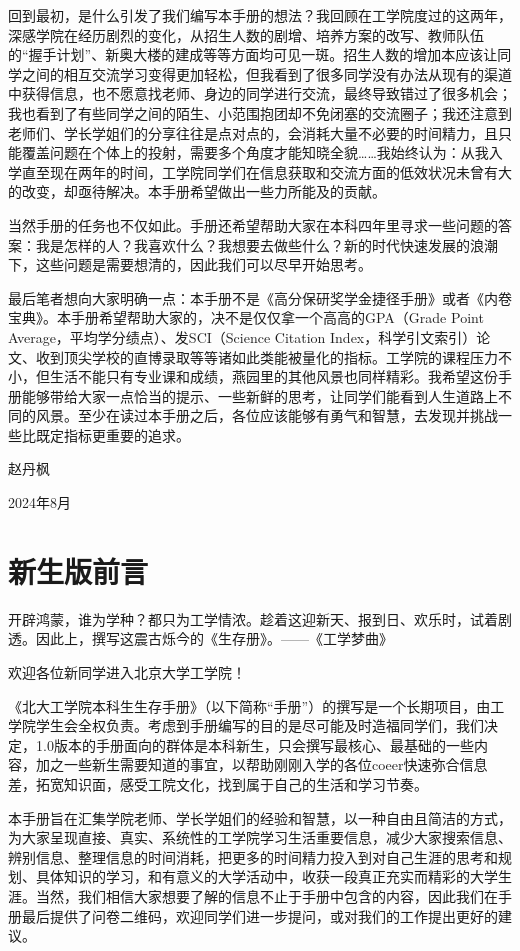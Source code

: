 \documentclass[11pt,oneside]{book}
\begin{document}
回到最初，是什么引发了我们编写本手册的想法？我回顾在工学院度过的这两年，深感学院在经历剧烈的变化，从招生人数的剧增、培养方案的改写、教师队伍的“握手计划”、新奥大楼的建成等等方面均可见一斑。招生人数的增加本应该让同学之间的相互交流学习变得更加轻松，但我看到了很多同学没有办法从现有的渠道中获得信息，也不愿意找老师、身边的同学进行交流，最终导致错过了很多机会；我也看到了有些同学之间的陌生、小范围抱团却不免闭塞的交流圈子；我还注意到老师们、学长学姐们的分享往往是点对点的，会消耗大量不必要的时间精力，且只能覆盖问题在个体上的投射，需要多个角度才能知晓全貌……我始终认为：从我入学直至现在两年的时间，工学院同学们在信息获取和交流方面的低效状况未曾有大的改变，却亟待解决。本手册希望做出一些力所能及的贡献。

当然手册的任务也不仅如此。手册还希望帮助大家在本科四年里寻求一些问题的答案：我是怎样的人？我喜欢什么？我想要去做些什么？新的时代快速发展的浪潮下，这些问题是需要想清的，因此我们可以尽早开始思考。

最后笔者想向大家明确一点：本手册不是《高分保研奖学金捷径手册》或者《内卷宝典》。本手册希望帮助大家的，决不是仅仅拿一个高高的GPA（Grade Point Average，平均学分绩点）、发SCI（Science Citation Index，科学引文索引）论文、收到顶尖学校的直博录取等等诸如此类能被量化的指标。工学院的课程压力不小，但生活不能只有专业课和成绩，燕园里的其他风景也同样精彩。我希望这份手册能够带给大家一点恰当的提示、一些新鲜的思考，让同学们能看到人生道路上不同的风景。至少在读过本手册之后，各位应该能够有勇气和智慧，去发现并挑战一些比既定指标更重要的追求。
\begin{flushright}
    赵丹枫
    
    2024年8月
\end{flushright}

\chapter*{新生版前言}
开辟鸿蒙，谁为学种？都只为工学情浓。趁着这迎新天、报到日、欢乐时，试着剧透。因此上，撰写这震古烁今的《生存册》。——《工学梦曲》

欢迎各位新同学进入北京大学工学院！

《北大工学院本科生生存手册》（以下简称“手册”）的撰写是一个长期项目，由工学院学生会全权负责。考虑到手册编写的目的是尽可能及时造福同学们，我们决定，1.0版本的手册面向的群体是本科新生，只会撰写最核心、最基础的一些内容，加之一些新生需要知道的事宜，以帮助刚刚入学的各位coeer快速弥合信息差，拓宽知识面，感受工院文化，找到属于自己的生活和学习节奏。

本手册旨在汇集学院老师、学长学姐们的经验和智慧，以一种自由且简洁的方式，为大家呈现直接、真实、系统性的工学院学习生活重要信息，减少大家搜索信息、辨别信息、整理信息的时间消耗，把更多的时间精力投入到对自己生涯的思考和规划、具体知识的学习，和有意义的大学活动中，收获一段真正充实而精彩的大学生涯。当然，我们相信大家想要了解的信息不止于手册中包含的内容，因此我们在手册最后提供了问卷二维码，欢迎同学们进一步提问，或对我们的工作提出更好的建议。
\end{document}
